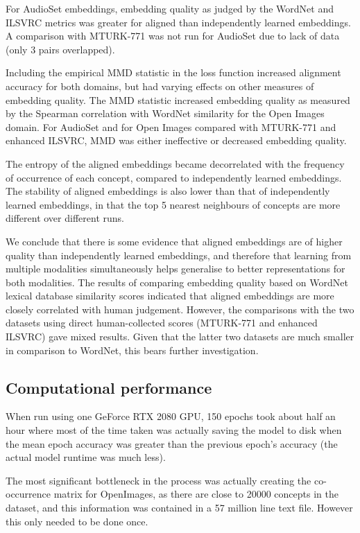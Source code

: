 For AudioSet embeddings, embedding quality as judged by the WordNet and ILSVRC metrics was greater for aligned than independently learned embeddings. A comparison with MTURK-771 was not run for AudioSet due to lack of data (only 3 pairs overlapped).  

Including the empirical MMD statistic in the loss function increased alignment accuracy for both domains, but had varying effects on other measures of embedding quality. The MMD statistic increased embedding quality as measured by the Spearman correlation with WordNet similarity for the Open Images domain. For AudioSet and for Open Images compared with MTURK-771 and enhanced ILSVRC, MMD was either ineffective or decreased embedding quality. 

The entropy of the aligned embeddings became decorrelated with the frequency of occurrence of each concept, compared to independently learned embeddings. The stability of aligned embeddings is also lower than that of independently learned embeddings, in that the top 5 nearest neighbours of concepts are more different over different runs.

We conclude that there is some evidence that aligned embeddings are of higher quality than independently learned embeddings, and therefore that learning from multiple modalities simultaneously helps generalise to better representations for both modalities. The results of comparing embedding quality based on WordNet lexical database similarity scores indicated that aligned embeddings are more closely correlated with human judgement. However, the comparisons with the two datasets using direct human-collected scores (MTURK-771 and enhanced ILSVRC) gave mixed results. Given that the latter two datasets are much smaller in comparison to WordNet, this bears further investigation. 

\subsection{Computational performance}

When run using one GeForce RTX 2080 GPU, 150 epochs took about half an hour where most of the time taken was actually saving the model to disk when the mean epoch accuracy was greater than the previous epoch's accuracy (the actual model runtime was much less). 

The most significant bottleneck in the process was actually creating the co-occurrence matrix for OpenImages, as there are close to 20000 concepts in the dataset, and this information was contained in a 57 million line text file. However this only needed to be done once. 

